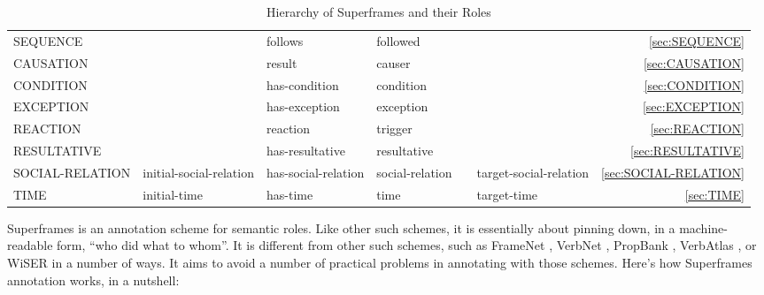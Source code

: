 \documentclass[a4paper]{article}
\newcommand{\fr}[1]{\textsf{#1}}
\newcommand{\rl}[1]{\textsf{#1}}
\newcommand{\Sub}{\textnoto{└} }
\newcommand{\SubSub}{\textcolor{white}{\Sub}\Sub}
\begin{document}
\begin{table}
{\begin{NiceTabular}{llllllr}
            \Sub{} \fr{SEQUENCE} & & \rl{follows} & \rl{followed} & & & \ref{sec:SEQUENCE} \\
            \SubSub{} \fr{CAUSATION} & & \rl{result} & \rl{causer} & & & \ref{sec:CAUSATION} \\
            \SubSub{} \fr{CONDITION} & & \rl{has-condition} & \rl{condition} & & & \ref{sec:CONDITION} \\
            \SubSub{} \fr{EXCEPTION} & & \rl{has-exception} & \rl{exception} & & & \ref{sec:EXCEPTION} \\
            \SubSub{} \fr{REACTION} & & \rl{reaction} & \rl{trigger} & & & \ref{sec:REACTION} \\
            \SubSub{} \fr{RESULTATIVE} & & \rl{has-resultative} & \rl{resultative} & & & \ref{sec:RESULTATIVE} \\

            \Sub{} \fr{SOCIAL-RELATION} & \rl{initial-social-relation} & \rl{has-social-relation} & \rl{social-relation} & & \rl{target-social-relation} & \ref{sec:SOCIAL-RELATION} \\

            \Sub{} \fr{TIME} & \rl{initial-time} & \rl{has-time} & \rl{time} & & \rl{target-time} & \ref{sec:TIME} \\

            \bottomrule
        \end{NiceTabular}
    }
    \caption{Hierarchy of Superframes and their Roles}
    \label{tab:superframes}
\end{table}

Superframes is an annotation scheme for semantic roles. Like other such
schemes, it is essentially about pinning down, in a machine-readable form,
``who did what to whom''. It is different from other such schemes, such as
FrameNet \citep{baker-etal-1998-berkeley}, VerbNet
\citep{kipper-schuler-2005-verbnet}, PropBank
\citep{palmer-etal-2005-proposition}, VerbAtlas
\citep{di-fabio-etal-2019-verbatlas}, or WiSER \citep{feng-etal-2022-widely} in
a number of ways. It aims to avoid a number of practical problems in annotating
with those schemes. Here's how Superframes annotation works, in a nutshell:
\end{document}
